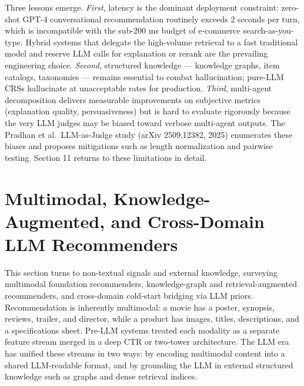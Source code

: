 Three lessons emerge. \emph{First}, latency is the dominant deployment constraint: zero-shot GPT-4 conversational recommendation routinely exceeds 2 seconds per turn, which is incompatible with the sub-200 ms budget of e-commerce search-as-you-type. Hybrid systems that delegate the high-volume retrieval to a fast traditional model and reserve LLM calls for explanation or rerank are the prevailing engineering choice. \emph{Second}, structured knowledge --- knowledge graphs, item catalogs, taxonomies --- remains essential to combat hallucination; pure-LLM CRSs hallucinate at unacceptable rates for production. \emph{Third}, multi-agent decomposition delivers measurable improvements on subjective metrics (explanation quality, persuasiveness) but is hard to evaluate rigorously because the very LLM judges may be biased toward verbose multi-agent outputs. The Pradhan et al.~LLM-as-Judge study (arXiv 2509.12382, 2025) enumerates these biases and proposes mitigations such as length normalization and pairwise testing. Section 11 returns to these limitations in detail.

\section{Multimodal, Knowledge-Augmented, and Cross-Domain LLM Recommenders}\label{multimodal-knowledge-augmented-and-cross-domain-llm-recommenders}

This section turns to non-textual signals and external knowledge, surveying multimodal foundation recommenders, knowledge-graph and retrieval-augmented recommenders, and cross-domain cold-start bridging via LLM priors. Recommendation is inherently multimodal: a movie has a poster, synopsis, reviews, trailer, and director, while a product has images, titles, descriptions, and a specifications sheet. Pre-LLM systems treated each modality as a separate feature stream merged in a deep CTR or two-tower architecture. The LLM era has unified these streams in two ways: by encoding multimodal content into a shared LLM-readable format, and by grounding the LLM in external structured knowledge such as graphs and dense retrieval indices.


